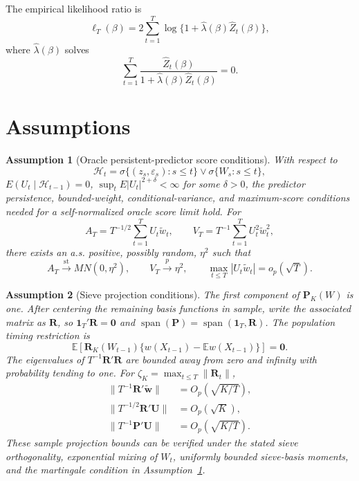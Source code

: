 \documentclass[11pt]{article}
\newtheorem{assumption}{Assumption}
\begin{document}
The empirical likelihood ratio is
\begin{equation}
    \ell_T(\beta)=2\sum_{t=1}^T\log\{1+\widehat\lambda(\beta)\widehat Z_t(\beta)\},
    \label{eq:tn-elr}
\end{equation}
where \(\widehat\lambda(\beta)\) solves
\begin{equation}
    \sum_{t=1}^T\frac{\widehat Z_t(\beta)}{1+\widehat\lambda(\beta)\widehat Z_t(\beta)}=0.
    \label{eq:tn-lambda}
\end{equation}

\section{Assumptions}

\begin{assumption}[Oracle persistent-predictor score conditions]
\label{ass:tn-score}
With respect to
\[
    \mathcal H_t=\sigma\{(z_s,\varepsilon_s):s\leq t\}\vee\sigma\{W_s:s\leq t\},
\]
\(E(U_t\mid\mathcal H_{t-1})=0\), \(\sup_tE|U_t|^{2+\delta}<\infty\) for some \(\delta>0\), the predictor persistence, bounded-weight, conditional-variance, and maximum-score conditions needed for a self-normalized oracle score limit hold. For
\[
    A_T=T^{-1/2}\sum_{t=1}^TU_t\widetilde w_t,
    \qquad
    V_T=T^{-1}\sum_{t=1}^TU_t^2\widetilde w_t^2,
\]
there exists an a.s. positive, possibly random, \(\eta^2\) such that
\begin{equation}
    A_T\xrightarrow{\mathrm{st}}MN(0,\eta^2),
    \qquad
    V_T\xrightarrow{p}\eta^2,
    \qquad
    \max_{t\leq T}|U_t\widetilde w_t|=o_p(\sqrt T).
    \label{eq:tn-score-oracle}
\end{equation}
\end{assumption}

\begin{assumption}[Sieve projection conditions]
\label{ass:tn-projection}
The first component of \(\bm P_K(W)\) is one. After centering the remaining basis functions in sample, write the associated matrix as \(\bm R\), so \(\bm1_T'\bm R=\bm0\) and \(\operatorname{span}(\bm P)=\operatorname{span}(\bm1_T,\bm R)\). The population timing restriction is
\[
    \mathbb E\left[\bm R_K(W_{t-1})\{w(X_{t-1})-\mathbb Ew(X_{t-1})\}\right]=\bm0.
\]
The eigenvalues of \(T^{-1}\bm R'\bm R\) are bounded away from zero and infinity with probability tending to one. For \(\zeta_K=\max_{t\leq T}\|\bm R_t\|\),
\begin{align}
    \|T^{-1}\bm R'\widetilde{\bm w}\|&=O_p(\sqrt{K/T}),
      \label{eq:tn-rate-rw}\\
    \|T^{-1/2}\bm R'\bm U\|&=O_p(\sqrt K),
      \label{eq:tn-rate-ru}\\
    \|T^{-1}\bm P'\bm U\|&=O_p(\sqrt{K/T}).
      \label{eq:tn-rate-pu}
\end{align}
These sample projection bounds can be verified under the stated sieve orthogonality, exponential mixing of \(W_t\), uniformly bounded sieve-basis moments, and the martingale condition in Assumption~\ref{ass:tn-score}.
\end{assumption}
\end{document}
